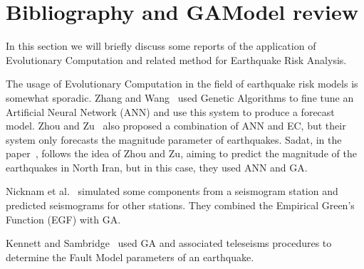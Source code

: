 
\section{Bibliography and GAModel review}\label{estadoArte}
In this section we will briefly discuss some reports of the
application of Evolutionary Computation and related method for
Earthquake Risk Analysis.

The usage of Evolutionary Computation in the field of earthquake risk models is somewhat sporadic. Zhang and Wang~\cite{Zhang2012} used Genetic Algorithms to fine tune an Artificial Neural Network (ANN) and use this system to produce a forecast model. Zhou and Zu~\cite{Feiyan2014} also proposed a combination of ANN and EC, but
their system only forecasts the magnitude parameter of
earthquakes. Sadat, in the paper~\cite{sadat2015application}, follows
the idea of Zhou and Zu, aiming to predict the magnitude of the
earthquakes in North Iran, but in this case, they used ANN and GA.

Nicknam et al.~\cite{Nicknam2010} simulated some components from a seismogram station and predicted seismograms for other stations. They combined the Empirical Green’s Function (EGF) with GA. %

Kennett and Sambridge~\cite{Kennett1992} used GA and associated teleseisms procedures to determine the Fault Model parameters of an earthquake. %

